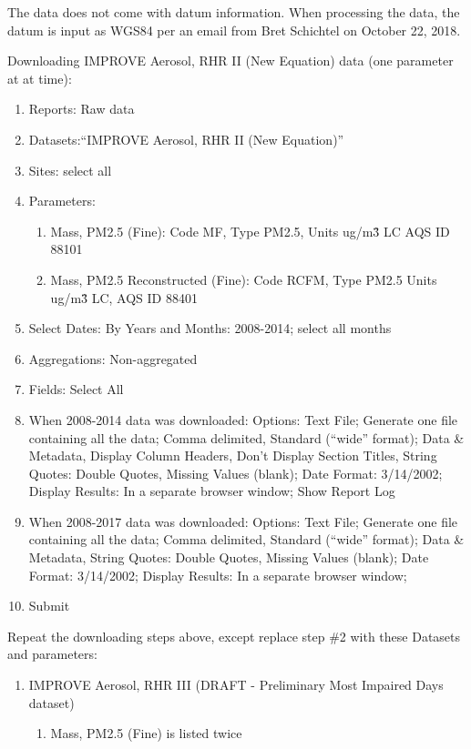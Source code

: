 The data does not come with datum information. When processing the data, the datum is input as WGS84 per an email from Bret Schichtel on October 22, 2018.

\noindent Downloading IMPROVE Aerosol, RHR II (New Equation) data (one parameter at at time):
\begin{enumerate}
\item Reports: Raw data
\item Datasets:``IMPROVE Aerosol, RHR II (New Equation)''
\item Sites: select all
\item Parameters: 
  \begin{enumerate}
  \item Mass, PM2.5 (Fine): Code MF, Type PM2.5, Units ug/m\^3 LC AQS ID 88101
  \item Mass, PM2.5 Reconstructed (Fine): Code RCFM, Type PM2.5 Units ug/m\^3 LC, AQS ID 88401
  \end{enumerate}
\item Select Dates: By Years and Months: 2008-2014; select all months
\item Aggregations: Non-aggregated
\item Fields: Select All
\item When 2008-2014 data was downloaded: Options: Text File; Generate one file containing all the data; Comma delimited, Standard (``wide'' format); Data \& Metadata, Display Column Headers, Don't Display Section Titles, String Quotes: Double Quotes, Missing Values (blank); Date Format: 3/14/2002; Display Results: In a separate browser window; Show Report Log
\item When 2008-2017 data was downloaded: Options: Text File; Generate one file containing all the data; Comma delimited, Standard (``wide'' format); Data \& Metadata, %
String Quotes: Double Quotes, Missing Values (blank); Date Format: 3/14/2002; Display Results: In a separate browser window; %

\item Submit
\end{enumerate}

Repeat the downloading steps above, except replace step \#2 with these Datasets and parameters:
\begin{enumerate}
\item IMPROVE Aerosol, RHR III (DRAFT - Preliminary Most Impaired Days dataset) 
	\begin{enumerate}
	\item Mass, PM2.5 (Fine) is listed twice %
	\end{enumerate}
\end{enumerate}

